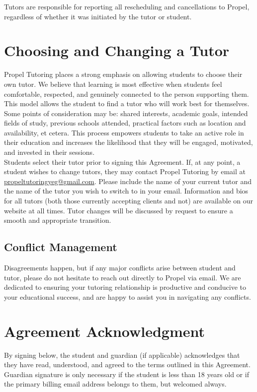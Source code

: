 \documentclass{article}
\begin{document}
Tutors are responsible for reporting all rescheduling and cancellations to Propel, regardless of whether it was initiated by the tutor or student.

\section{Choosing and Changing a Tutor}
Propel Tutoring places a strong emphasis on allowing students to choose their own tutor. We believe that learning is most effective when students feel comfortable, respected, and genuinely connected to the person supporting them. This model allows the student to find a tutor who will work best for themselves. Some points of consideration may be: shared interests, academic goals, intended fields of study, previous schools attended, practical factors such as location and availability, et cetera. This process empowers students to take an active role in their education and increases the likelihood that they will be engaged, motivated, and invested in their sessions.\\

Students select their tutor prior to signing this Agreement. If, at any point, a student wishes to change tutors, they may contact Propel Tutoring by email at \href{mailto:propeltutoringyeg@gmail.com}{propeltutoringyeg@gmail.com}. Please include the name of your current tutor and the name of the tutor you wish to switch to in your email. Information and bios for all tutors (both those currently accepting clients and not) are available on our website at all times. Tutor changes will be discussed by request to ensure a smooth and appropriate transition.

\subsection{Conflict Management}
Disagreements happen, but if any major conflicts arise between student and tutor, please do not hesitate to reach out directly to Propel via email. We are dedicated to ensuring your tutoring relationship is productive and conducive to your educational success, and are happy to assist you in navigating any conflicts.

\section{Agreement Acknowledgment}
By signing below, the student and guardian (if applicable) acknowledges that they have read, understood, and agreed to the terms outlined in this Agreement. Guardian signature is only necessary if the student is less than 18 years old or if the primary billing email address belongs to them, but welcomed always.
\end{document}
